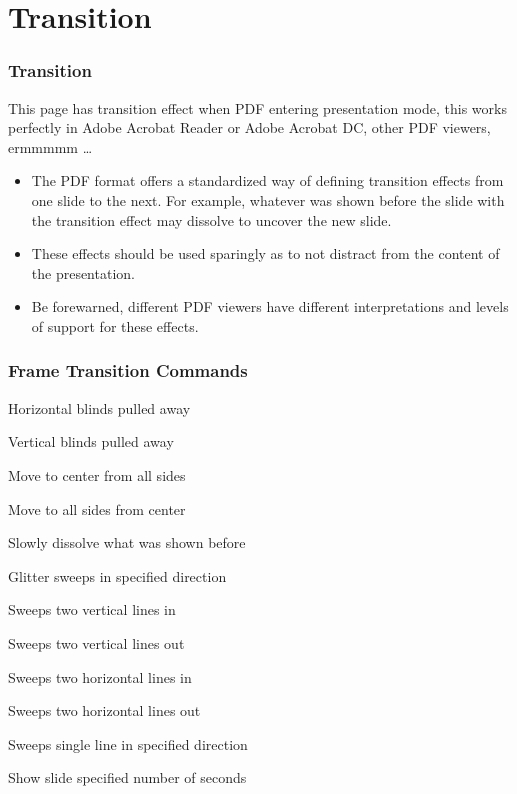 \documentclass[aspectratio=169,utf8]{ctexbeamer}
\begin{document}
\section{Transition}

\begin{frame}
  \frametitle{Transition}
  \transboxin

  This page has transition effect when PDF entering presentation mode, this works perfectly in Adobe Acrobat Reader or  Adobe Acrobat DC, other PDF viewers, ermmmmm \ldots
  
  \begin{itemize}
    \item The PDF format offers a standardized way of defining transition effects from one slide to the next. For example, whatever was shown before the slide with the transition effect may dissolve to uncover the new slide.
    \item These effects should be used sparingly as to not distract from the content of the presentation.
    \item Be forewarned, different PDF viewers have different interpretations and levels of support for these effects.
  \end{itemize}
\end{frame}


\begin{frame}
  \frametitle{Frame Transition Commands}

  \begin{description}[labelindent=0pt, labelwidth=6cm]
    \scriptsize
    \item[\texttt{\textbackslash{}transblindshorizontal}] Horizontal blinds pulled away
    \item[\texttt{\textbackslash{}transblindsvertical}] Vertical blinds pulled away
    \item[\texttt{\textbackslash{}transboxin}] Move to center from all sides
    \item[\texttt{\textbackslash{}transboxout}] Move to all sides from center
    \item[\texttt{\textbackslash{}transdissolve}] Slowly dissolve what was shown before
    \item[\texttt{\textbackslash{}transglitter}] Glitter sweeps in specified direction
    \item[\texttt{\textbackslash{}transslipverticalin}] Sweeps two vertical lines in
    \item[\texttt{\textbackslash{}transslipverticalout}] Sweeps two vertical lines out
    \item[\texttt{\textbackslash{}transhorizontalin}] Sweeps two horizontal lines in
    \item[\texttt{\textbackslash{}transhorizontalout}] Sweeps two horizontal lines out
    \item[\texttt{\textbackslash{}transwipe}] Sweeps single line in specified direction
    \item[\texttt{\textbackslash{}transduration\{2\}}] Show slide specified number of seconds
  \end{description}
  
\end{frame}
\end{document}
